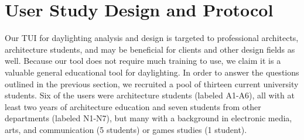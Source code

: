 \documentclass[review]{vgtc}                 %
\begin{document}
\section{User Study Design and Protocol}

Our TUI for daylighting analysis and design is targeted to
professional architects, architecture students, and may be beneficial
for clients and other design fields as well.  Because our tool does
not require much training to use, we claim it is a valuable general
educational tool for daylighting.  In order to answer the questions
outlined in the previous section, we recruited a pool of thirteen
current university students.  Six of the users were architecture
students (labeled A1-A6), all with at least two years of architecture
education and seven students from other departments (labeled N1-N7),
but many with a background in electronic media, arts, and
communication (5 students) or games studies (1 student).


\end{document}
